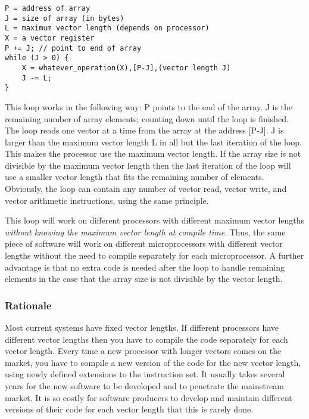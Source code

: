 \documentclass[forwardcom.tex]{subfiles}
\begin{document}
\begin{lstlisting}[frame=single]
P = address of array
J = size of array (in bytes)
L = maximum vector length (depends on processor)
X = a vector register
P += J; // point to end of array
while (J > 0) {
    X = whatever_operation(X),[P-J],(vector length J)
    J -= L;
}
\end{lstlisting}

This loop works in the following way: P points to the end of the array. J is the remaining number of array elements; counting down until the loop is finished. The loop reads one vector at a time from the array at the address [P-J]. J is larger than the maximum vector length L in all but the last iteration of the loop. This makes the processor use the maximum vector length. If the array size is not divisible by the maximum vector length then the last iteration of the loop will use a smaller vector length that fits the remaining number of elements. Obviously, the loop can contain any number of vector read, vector write, and vector arithmetic instructions, using the same principle. 
\vspace{2mm}

This loop will work on different processors with different maximum vector lengths \textit{without knowing the maximum vector length at compile time}. Thus, the same piece of software will work on different microprocessors with different vector lengths without the need to compile separately for each microprocessor. A further advantage is that no extra code is needed after the loop to handle remaining elements in the case that the array size is not divisible by the vector length.

\subsubsection{Rationale}
Most current systems have fixed vector lengths. If different processors have different vector lengths then you have to compile the code separately for each vector length. Every time a new processor with longer vectors comes on the market, you have to compile a new version of the code for the new vector length, using newly defined extensions to the instruction set. It usually takes several years for the new software to be developed and to penetrate the mainstream market. It is so costly for software producers to develop and maintain different versions of their code for each vector length that this is rarely done.
\vspace{2mm}
\end{document}

